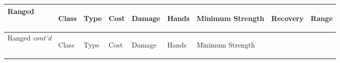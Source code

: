 \documentclass[twoside]{book}
\begin{document}
\begin{longtable}{p{1.25in}llllp{2em}p{2em}lp{2em}} 
  Ranged
  &
  \begin{turn}{70}{Class}\end{turn}
          
  &
  \begin{turn}{70}{Type}\end{turn}
          
  &
  \begin{turn}{70}{Cost}\end{turn}
          
  &
  \begin{turn}{70}{Damage}\end{turn}
          
  &
  \begin{turn}{70}{Hands}\end{turn}
          
  &
  \begin{turn}{70}{Minimum Strength}\end{turn}
          
  &
  \begin{turn}{70}{Recovery}\end{turn}
          
  &
  \begin{turn}{70}{Range}\end{turn}
          
  \\
  \hline
  \hline
  \endfirsthead
  Ranged \textit{cont'd}
        
  &
  \begin{turn}{70}{Class}\end{turn}
          
  &
  \begin{turn}{70}{Type}\end{turn}
          
  &
  \begin{turn}{70}{Cost}\end{turn}
          
  &
  \begin{turn}{70}{Damage}\end{turn}
          
  &
  \begin{turn}{70}{Hands}\end{turn}
          
  &
  \begin{turn}{70}{Minimum Strength}\end{turn}
          

\end{longtable}
\end{document}
